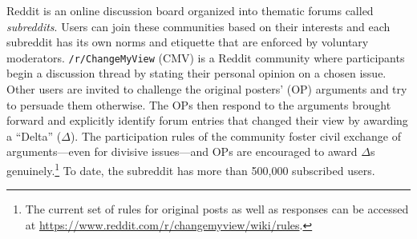 Reddit is an online discussion board organized into thematic forums called \textit{subreddits}. Users can join these communities based on their interests and each subreddit has its own norms and etiquette that are enforced by voluntary moderators. \texttt{/r/ChangeMyView} (CMV) is a Reddit community where participants begin a discussion thread by stating their personal opinion on a chosen issue. Other users are invited to challenge the original posters' (OP) arguments and try to persuade them otherwise. The OPs then respond to the arguments brought forward and explicitly identify forum entries that changed their view by awarding a ``Delta'' ($\Delta$). The participation rules of the community foster civil exchange of arguments---even for divisive issues---and OPs are encouraged to award \(\Delta\)s genuinely.\footnote{The current set of rules for original posts as well as responses can be accessed at \url{https://www.reddit.com/r/changemyview/wiki/rules}.} To date, the subreddit has more than 500,000 subscribed users.

